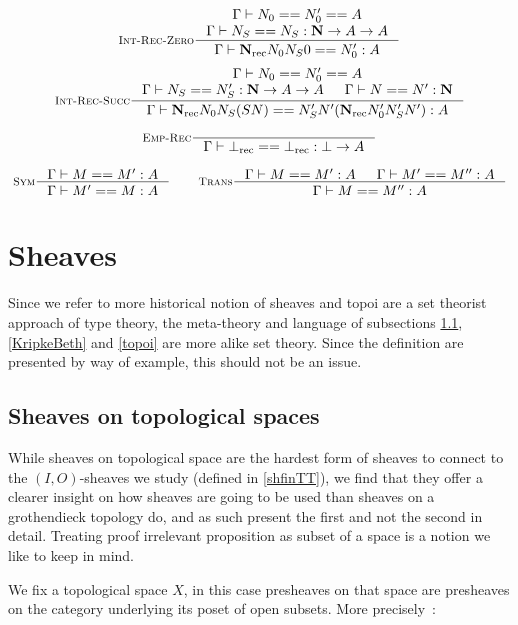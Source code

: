 \documentclass[11pt]{article}
\DeclareMathOperator{\rec}{rec}
\newcommand{\0}{\mathbf{0}}
\newcommand{\1}{\mathbf{1}}
\newcommand{\nat}{\mathbf{N}}
\newcommand{\tctx}{\Gamma}
\begin{document}
$$
    \inference[\textsc{Int-Rec-Zero}]{\tctx |- N_0 == N'_0 == A\\ \tctx |- N_S == N_S : \nat -> A  -> A}{\tctx |- \nat_{\rec} N_0N_S0 == N'_0 : A}
$$
$$
    \inference[\textsc{Int-Rec-Succ}]{\tctx |- N_0 == N'_0 == A\\ \tctx |- N_S == N'_S : \nat -> A  -> A & \tctx |- N == N' :\nat}{\tctx |- \nat_{\rec} N_0N_S (S N) == N'_S N' (\nat_{\rec}N'_0 N'_S N') : A}
$$


$$
    \inference[\textsc{Emp-Rec}]{}{\tctx |- \bot_{\rec} == \bot_{\rec} : \bot -> A}
$$

$$
    \inference[\textsc{Sym}]{\tctx |- M == M' : A}{\tctx |- M' == M : A} \qquad
    \inference[\textsc{Trans}]
    {\tctx |- M == M' :A & \tctx |- M' == M'' : A}{\tctx |- M == M'' : A}
$$

\section{Sheaves}\label{Sheaves}

Since we refer to more historical notion of sheaves and topoi are a set theorist approach of type theory, the meta-theory and language of subsections \ref{topsheaves}, \ref{KripkeBeth} and  \ref{topoi} are more alike set theory.
Since the definition are presented by way of example, this should not be an issue.

\subsection{Sheaves on topological spaces}\label{topsheaves}

While sheaves on topological space are the hardest form of sheaves to connect to the $(I,O)$-sheaves we study (defined in \ref{shfinTT}), we find that they offer a clearer insight on how sheaves are going to be used than sheaves on a grothendieck topology do, and as such present the first and not the second in detail.
Treating proof irrelevant proposition as subset of a space is a notion we like to keep in mind.

We fix a topological space $X$, in this case presheaves on that space are presheaves on the category underlying its poset of open subsets. More precisely~:
\end{document}
